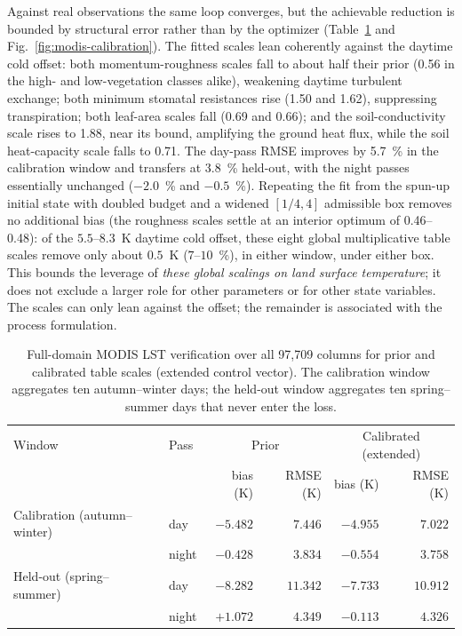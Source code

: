 Against real observations the same loop converges, but the achievable
reduction is bounded by structural error rather than by the optimizer
(Table~\ref{tab:modis-calibration} and Fig.~\ref{fig:modis-calibration}).
The fitted scales lean coherently against the daytime cold offset: both
momentum-roughness scales fall to about half their prior (0.56 in the
high- and low-vegetation classes alike), weakening daytime turbulent
exchange; both minimum stomatal resistances rise (1.50 and 1.62),
suppressing transpiration; both leaf-area scales fall (0.69 and 0.66); and
the soil-conductivity scale rises to 1.88, near its bound, amplifying
the ground heat flux, while the soil heat-capacity scale falls to 0.71. The day-pass RMSE
improves by 5.7~\% in the calibration window and transfers at 3.8~\%
held-out, with the night passes essentially unchanged
($-2.0$~\% and $-0.5$~\%). Repeating the fit
from the spun-up initial state with doubled budget and a widened $[1/4,4]$
admissible box removes no additional bias (the roughness scales settle at an
interior optimum of 0.46--0.48): of the $5.5$--$8.3$~K daytime cold
offset, these eight global multiplicative table scales remove only about
$0.5$~K
($7$--$10$~\%), in either window, under either box. This bounds the leverage
of \emph{these global scalings on land surface temperature}; it does not
exclude a larger role for other parameters or for other state variables. The
scales can only
lean against the offset; the remainder is associated with the process
formulation.

\begin{table}[t]
\caption{Full-domain MODIS LST verification over all 97,709 columns for prior
and calibrated table scales (extended control vector). The calibration window
aggregates ten autumn--winter days; the held-out window aggregates ten
spring--summer days that never enter the loss.}
\label{tab:modis-calibration}
\centering
\small
\begin{tabular}{llrrrr}
\hline
Window & Pass & \multicolumn{2}{c}{Prior} & \multicolumn{2}{c}{Calibrated (extended)} \\
 & & bias (K) & RMSE (K) & bias (K) & RMSE (K) \\
\hline
Calibration (autumn--winter) & day & $-5.482$ & $7.446$ & $-4.955$ & $7.022$ \\
 & night & $-0.428$ & $3.834$ & $-0.554$ & $3.758$ \\
Held-out (spring--summer) & day & $-8.282$ & $11.342$ & $-7.733$ & $10.912$ \\
 & night & $+1.072$ & $4.349$ & $-0.113$ & $4.326$ \\
\hline
\end{tabular}
\end{table}

